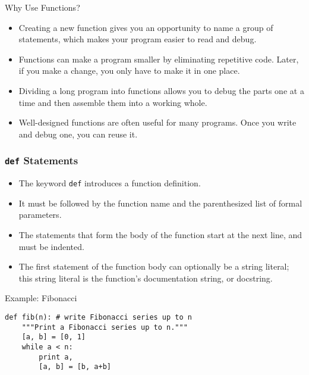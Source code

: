 \documentclass{beamer}
\begin{document}
\begin{frame}{Why Use Functions?}
\begin{itemize}

\item Creating a new function gives you an opportunity to \alert{name a group
of statements}, which makes your program easier to read and debug.

\item Functions can make a program smaller by \alert{eliminating repetitive
code}.  Later, if you make a change, you only have
to make it in one place.

\item Dividing a long program into functions allows you to \alert{debug the
parts one at a time} and then assemble them into a working whole.

\item Well-designed functions are often useful for many programs.
Once you write and debug one, you can \alert{reuse it}.

\end{itemize}
\end{frame}
\begin{frame}[fragile]
\frametitle{\texttt{def} Statements}

\begin{itemize}
\small
\item The keyword \texttt{def} introduces a \alert{function definition}.
\item It must be followed by the \alert{function name} and the \alert{parenthesized list of formal parameters}. 
\item The statements that form the body of the function start at the next line, and must be indented.
\item The first statement of the function body can optionally be a string literal; this string literal is the function's documentation string, or  \alert{{docstring}}.
\end{itemize}
\begin{block}{Example: Fibonacci}
\small
\begin{verbatim}
def fib(n):	# write Fibonacci series up to n
    """Print a Fibonacci series up to n."""
    [a, b] = [0, 1] 
    while a < n:
        print a, 
        [a, b] = [b, a+b]
\end{verbatim}
\end{block}
\end{frame}
\end{document}
